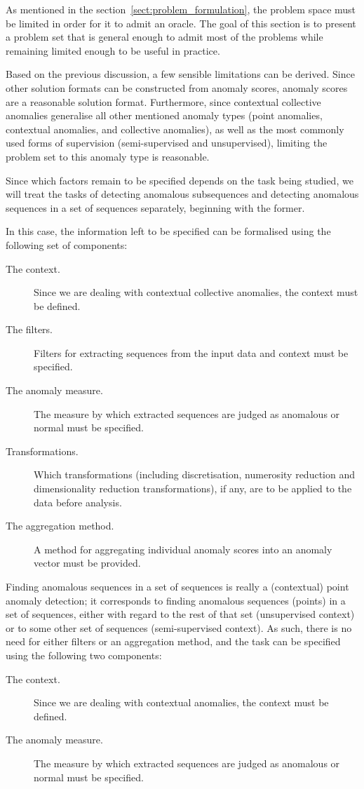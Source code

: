 As mentioned in the section~\ref{sect:problem_formulation}, the problem space must be limited in order for it to admit an oracle. The goal of this section is to present a problem set that is general enough to admit most of the problems while remaining limited enough to be useful in practice.

Based on the previous discussion, a few sensible limitations can be derived. Since other solution formats can be constructed from anomaly scores, anomaly scores are a reasonable solution format. Furthermore, since contextual collective anomalies generalise all other mentioned anomaly types (point anomalies, contextual anomalies, and collective anomalies), as well as the most commonly used forms of supervision (semi-supervised and unsupervised), limiting the problem set to this anomaly type is reasonable.

Since which factors remain to be specified depends on the task being studied, we will treat the tasks of detecting anomalous subsequences and detecting anomalous sequences in a set of sequences separately, beginning with the former.

In this case, the information left to be specified can be formalised using the following set of components:
\begin{description}
  \item[The context.] Since we are dealing with contextual collective anomalies, the context must be defined.
  \item[The filters.] Filters for extracting sequences from the input data and context must be specified.
  \item[The anomaly measure.] The measure by which extracted sequences are judged as anomalous or normal must be specified.
  \item[Transformations.] Which transformations (including discretisation, numerosity reduction and dimensionality reduction transformations), if any, are to be applied to the data before analysis.
  \item[The aggregation method.] A method for aggregating individual anomaly scores into an anomaly vector must be provided.
\end{description}

Finding anomalous sequences in a set of sequences is really a (contextual) point anomaly detection; it corresponds to finding anomalous sequences (points) in a set of sequences, either with regard to the rest of that set (unsupervised context) or to some other set of sequences (semi-supervised context). As such, there is no need for either filters or an aggregation method, and the task can be specified using the following two components:
\begin{description}
  \item[The context.] Since we are dealing with contextual anomalies, the context must be defined.
  \item[The anomaly measure.] The measure by which extracted sequences are judged as anomalous or normal must be specified.
\end{description}

